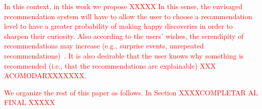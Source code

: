 


\textcolor{red}{In this context, in this work we propose XXXXX In this sense, the envisaged
recommendation system will have to allow the user to choose a recommendation level to have a
greater probability of making happy discoveries in order to sharpen their curiosity. Also
according to the users’ wishes, the serendipity of recommendations may increase (e.g., surprise
events, unrepeated recommendations)~\cite{kotkov2016survey}. It is also desirable that the user knows why
something is recommended (i.e., that the recommendations are explainable) XXX ACOMODARXXXXXXX.
}

\textcolor{red}{We organize the rest of this paper as follows. In Section XXXXCOMPLETAR AL FINAL XXXXX}


